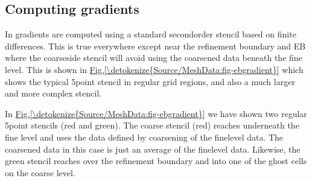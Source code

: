 \documentclass[letterpaper,10pt,english]{sphinxmanual}
\begin{document}
\begin{sphinxVerbatim}[commandchars=\\\{\},formatcom=\scriptsize]
            

          
             

             
\end{sphinxVerbatim}


\subsection{Computing gradients}
\label{\detokenize{Source/MeshData:computing-gradients}}\label{\detokenize{Source/MeshData:chap-gradients}}
In  gradients are computed using a standard second\sphinxhyphen{}order stencil based on finite differences.
This is true everywhere except near the refinement boundary and EB where the coarse\sphinxhyphen{}side stencil will avoid using the coarsened data beneath the fine level.
This is shown in \hyperref[\detokenize{Source/MeshData:fig-ebgradient}]{Fig.\@ \ref{\detokenize{Source/MeshData:fig-ebgradient}}} which shows the typical 5\sphinxhyphen{}point stencil in regular grid regions, and also a much larger and more complex stencil.

In \hyperref[\detokenize{Source/MeshData:fig-ebgradient}]{Fig.\@ \ref{\detokenize{Source/MeshData:fig-ebgradient}}} we have shown two regular 5\sphinxhyphen{}point stencils (red and green).
The coarse stencil (red) reaches underneath the fine level and uses the data defined by coarsening of the fine\sphinxhyphen{}level data.
The coarsened data in this case is just an average of the fine\sphinxhyphen{}level data.
Likewise, the green stencil reaches over the refinement boundary and into one of the ghost cells on the coarse level.
\end{document}
